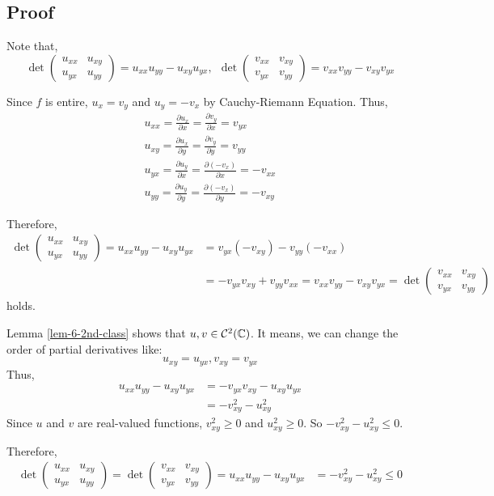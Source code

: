 \subsection*{Proof}

Note that,
\[
\det
\begin{pmatrix}
u_{xx} & u_{xy} \\ u_{yx} & u_{yy}
\end{pmatrix}
= u_{xx} u_{yy} - u_{xy} u_{yx},\ \ 
\det
\begin{pmatrix}
v_{xx} & v_{xy} \\ v_{yx} & v_{yy}
\end{pmatrix}
= v_{xx} v_{yy} - v_{xy} v_{yx}
\]

Since \(f\) is entire,
\(u_x = v_y\) and \(u_y = -v_x\) by Cauchy-Riemann Equation.
Thus,
\begin{gather*}
   u_{xx} = \frac{\partial u_x}{\partial x} 
   = \frac{\partial v_y}{\partial x} = v_{yx}
\\ u_{xy} = \frac{\partial u_x}{\partial y} 
   = \frac{\partial v_y}{\partial y} = v_{yy}
\\ u_{yx} = \frac{\partial u_y}{\partial x} 
   = \frac{\partial (-v_x)}{\partial x} = -v_{xx}
\\ u_{yy} = \frac{\partial u_y}{\partial y} 
   = \frac{\partial (-v_x)}{\partial y} = -v_{xy}
\end{gather*}

Therefore,
\begin{align*}
\det
\begin{pmatrix}
u_{xx} & u_{xy} \\ u_{yx} & u_{yy}
\end{pmatrix}
  = u_{xx} u_{yy} - u_{xy} u_{yx}
  &= v_{yx} (- v_{xy}) - v_{yy} (- v_{xx})
  \\&= -v_{yx}v_{xy} + v_{yy} v_{xx}
  = v_{xx}v_{yy} - v_{xy} v_{yx}
  =
  \det
\begin{pmatrix}
v_{xx} & v_{xy} \\ v_{yx} & v_{yy}
\end{pmatrix}
\end{align*}
holds.

Lemma \ref{lem-6-2nd-class} shows that \(u, v \in \mathcal{C}^{2}(\mathbb{C})\).
It means, we can change the order of partial derivatives like:
\[ u_{xy} = u_{yx}, v_{xy} = v_{yx} \]
Thus,
\begin{align*}
  u_{xx}u_{yy} - u_{xy}u_{yx}
  &= -v_{yx}v_{xy} - u_{xy}u_{yx}
  \\&= -v_{xy}^2 - u_{xy}^2
\end{align*}
Since \(u\) and \(v\) are real-valued functions, \(v_{xy}^2 \ge 0\) and \(u_{xy}^2 \ge 0\).
So \(-v_{xy}^2 - u_{xy}^2 \le 0\).

Therefore,
\begin{align*}
\det
\begin{pmatrix}
u_{xx} & u_{xy} \\ u_{yx} & u_{yy}
\end{pmatrix}
=
\det
\begin{pmatrix}
v_{xx} & v_{xy} \\ v_{yx} & v_{yy}
\end{pmatrix}
= u_{xx}u_{yy} - u_{xy}u_{yx}
&= -v_{xy}^2 - u_{xy}^2
\le 0
\end{align*}
\qedsq